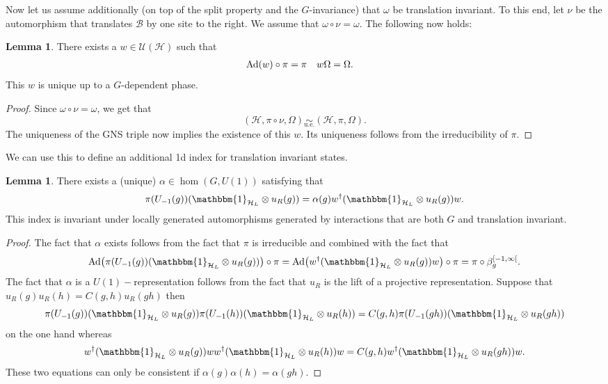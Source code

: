 \documentclass[12pt,a4paper,twoside]{article}
\let\originalleft\left
\let\originalright\right
\renewcommand{\left}{\mathopen{}\mathclose\bgroup\originalleft}
\renewcommand{\right}{\aftergroup\egroup\originalright}
\newcommand{\UU}{\mathcal U}
\newcommand{\BB}{\mathcal B}
\newcommand{\HH}{\mathcal H}
\newcommand{\id}{\mathbbm{1}}
\newcommand{\Ad}[1]{\textrm{Ad}\left(#1\right)}
\newcommand{\ue}{\underset{\text{u.e.}}{\sim}}
\theoremstyle{definition}
\newtheorem{lemma}[theorem]{Lemma}
\numberwithin{equation}{section}
\begin{document}
Now let us assume additionally (on top of the split property and the $G$-invariance) that $\omega$ be translation invariant. To this end, let $\nu$ be the automorphism that translates $\BB$ by one site to the right. We assume that $\omega\circ\nu=\omega$. The following now holds:
\begin{lemma}
	There exists a $w\in\UU(\HH)$ such that
	\begin{align}
		\Ad{w}\circ\pi&=\pi&w\Omega&=\Omega.
	\end{align}
	This $w$ is unique up to a $G$-dependent phase.
\end{lemma}
\begin{proof}
	Since $\omega\circ\nu=\omega$, we get that
	\begin{equation}
		(\HH,\pi\circ\nu,\Omega)\ue (\HH,\pi,\Omega).
	\end{equation}
	The uniqueness of the GNS triple now implies the existence of this $w$. Its uniqueness follows from the irreducibility of $\pi$.
\end{proof}
We can use this to define an additional 1d index for translation invariant states.
\begin{lemma}
	There exists a (unique) $\alpha\in\hom(G,U(1))$ satisfying that
	\begin{equation}
		\pi(U_{-1}(g)) (\id_{\HH_L}\otimes u_R(g))=\alpha(g)w^\dagger(\id_{\HH_L}\otimes u_R(g)) w.
	\end{equation}
	This index is invariant under locally generated automorphisms generated by interactions that are both $G$ and translation invariant.
\end{lemma}
\begin{proof}
	The fact that $\alpha$ exists follows from the fact that $\pi$ is irreducible and combined with the fact that
	\begin{equation}
		\Ad{\pi(U_{-1}(g)) (\id_{\HH_L}\otimes u_R(g))}\circ\pi=\Ad{w^\dagger(\id_{\HH_L}\otimes u_R(g)) w}\circ\pi=\pi\circ\beta_g^{[-1,\infty[}.
	\end{equation}
	The fact that $\alpha$ is a $U(1)-$representation follows from the fact that $u_R$ is the lift of a projective representation. Suppose that $u_R(g)u_R(h)=C(g,h)u_R(gh)$ then
	\begin{equation}
		\pi(U_{-1}(g)) (\id_{\HH_L}\otimes u_R(g))\pi(U_{-1}(h)) (\id_{\HH_L}\otimes u_R(h))=C(g,h)\pi(U_{-1}(gh)) (\id_{\HH_L}\otimes u_R(gh))
	\end{equation}
	on the one hand whereas
	\begin{equation}
		w^\dagger(\id_{\HH_L}\otimes u_R(g)) ww^\dagger(\id_{\HH_L}\otimes u_R(h)) w=C(g,h)w^\dagger(\id_{\HH_L}\otimes u_R(gh)) w.
	\end{equation}
	These two equations can only be consistent if $\alpha(g)\alpha(h)=\alpha(gh)$.
\end{proof}
\end{document}

